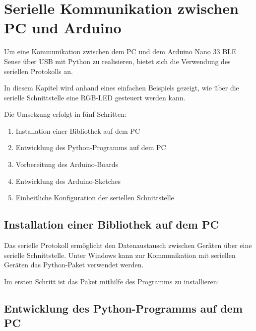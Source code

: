 %
%
%



\chapter{Serielle Kommunikation zwischen PC und Arduino} \label{SerialCom}

Um eine Kommunikation zwischen dem PC und dem Arduino Nano 33 BLE Sense über USB mit Python zu realisieren, bietet sich die Verwendung des seriellen Protokolls an.

In diesem Kapitel wird anhand eines einfachen Beispiels gezeigt, wie über die serielle Schnittstelle eine RGB-LED gesteuert werden kann.

Die Umsetzung erfolgt in fünf Schritten:

\begin{enumerate}
	\item Installation einer Bibliothek auf dem PC
	\item Entwicklung des Python-Programms auf dem PC
	\item Vorbereitung des Arduino-Boards
	\item Entwicklung des Arduino-Sketches
	\item Einheitliche Konfiguration der seriellen Schnittstelle
\end{enumerate}

\section{Installation einer Bibliothek auf dem PC}

Das serielle Protokoll ermöglicht den Datenaustausch zwischen Geräten über eine serielle Schnittstelle. Unter Windows kann zur Kommunikation mit seriellen Geräten das Python-Paket  verwendet werden.

Im ersten Schritt ist das Paket  mithilfe des Programms  zu installieren:

\medskip


\section{Entwicklung des Python-Programms auf dem PC}

